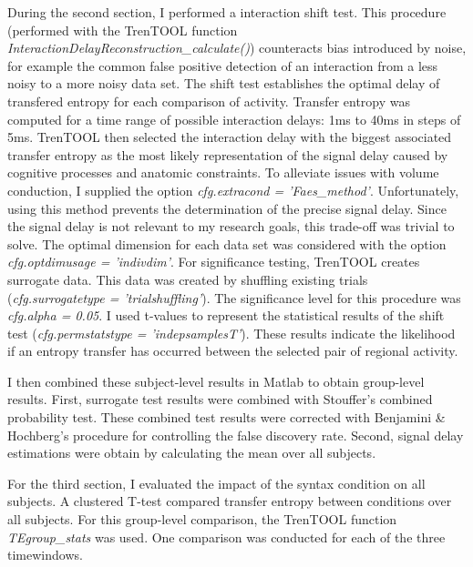 During the second section, I performed a interaction shift test.
This procedure (performed with the TrenTOOL function \emph{InteractionDelayReconstruction\_calculate()}) counteracts bias introduced by noise, for example the common false positive detection of an interaction from a less noisy to a more noisy data set.
The shift test establishes the optimal delay of transfered entropy for each comparison of activity.
Transfer entropy was computed for a time range of possible interaction delays: 1ms to 40ms in steps of 5ms.
TrenTOOL then selected the interaction delay with the biggest associated transfer entropy as the most likely representation of the signal delay caused by cognitive processes and anatomic constraints.
To alleviate issues with volume conduction, I supplied the option \emph{cfg.extracond = 'Faes\_method'}.
Unfortunately, using this method prevents the determination of the precise signal delay.
Since the signal delay is not relevant to my research goals, this trade-off was trivial to solve.
The optimal dimension for each data set was considered with the option \emph{cfg.optdimusage = 'indivdim'}.
For significance testing, TrenTOOL creates surrogate data.
This data was created by shuffling existing trials (\emph{cfg.surrogatetype = 'trialshuffling'}).
The significance level for this procedure was \emph{cfg.alpha = 0.05}.
I used t-values to represent the statistical results of the shift test (\emph{cfg.permstatstype = 'indepsamplesT'}).
These results indicate the likelihood if an entropy transfer has occurred between the selected pair of regional activity.

I then combined these subject-level results in Matlab to obtain group-level results.
First, surrogate test results were combined with Stouffer's combined probability test.
These combined test results were corrected with Benjamini & Hochberg's procedure for controlling the false discovery rate.
Second, signal delay estimations were obtain by calculating the mean over all subjects.


For the third section, I evaluated the impact of the syntax condition on all subjects.
A clustered T-test compared transfer entropy between conditions over all subjects.
For this group-level comparison, the TrenTOOL function \emph{TEgroup\_stats} was used.
One comparison was conducted for each of the three timewindows.